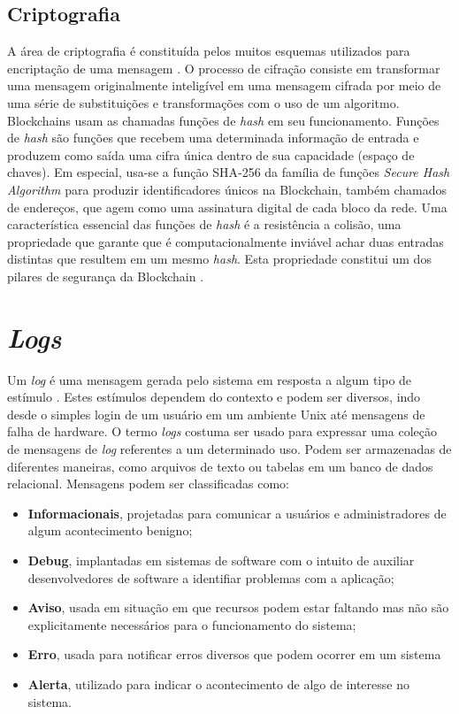 \subsection{Criptografia}
A área de criptografia é constituída pelos muitos esquemas utilizados para encriptação de uma mensagem \cite{Stallings2015}. O processo de cifração consiste em transformar uma mensagem originalmente inteligível em uma mensagem cifrada por meio de uma série de substituições e transformações com o uso de um algoritmo. Blockchains usam as chamadas funções de \emph{hash} em seu funcionamento. Funções de \emph{hash} são funções que recebem uma determinada informação de entrada e produzem como saída uma cifra única dentro de sua capacidade (espaço de chaves). Em especial, usa-se a função SHA-256 da família de funções \emph{Secure Hash Algorithm} para produzir identificadores únicos na Blockchain, também chamados de endereços, que agem como uma assinatura digital de cada bloco da rede. Uma característica essencial das funções de \emph{hash} é a resistência a colisão, uma propriedade que garante que é computacionalmente inviável achar duas entradas distintas que resultem em um mesmo \emph{hash}. Esta propriedade constitui um dos pilares de segurança da Blockchain \cite{Karame2016-qb}.

\section{\emph{Logs}}
Um \emph{log} é uma mensagem gerada pelo sistema em resposta a algum tipo de estímulo \cite{Chuvakin2013-za}. Estes estímulos dependem do contexto e podem ser diversos, indo desde o simples login de um usuário em um ambiente Unix até mensagens de falha de hardware. O termo \emph{logs} costuma ser usado para expressar uma coleção de mensagens de \emph{log} referentes a um determinado uso. Podem ser armazenadas de diferentes maneiras, como arquivos de texto ou tabelas em um banco de dados relacional. Mensagens podem ser classificadas como:

\begin{itemize}
    \item \textbf{Informacionais}, projetadas para comunicar a usuários e administradores de algum acontecimento benigno;
    \item \textbf{Debug}, implantadas em sistemas de software com o intuito de auxiliar desenvolvedores de software a identifiar problemas com a aplicação;
    \item \textbf{Aviso}, usada em situação em que recursos podem estar faltando mas não são explicitamente necessários para o funcionamento do sistema;
    \item \textbf{Erro}, usada para notificar erros diversos que podem ocorrer em um sistema
    \item \textbf{Alerta}, utilizado para indicar o acontecimento de algo de interesse no sistema.
\end{itemize}

